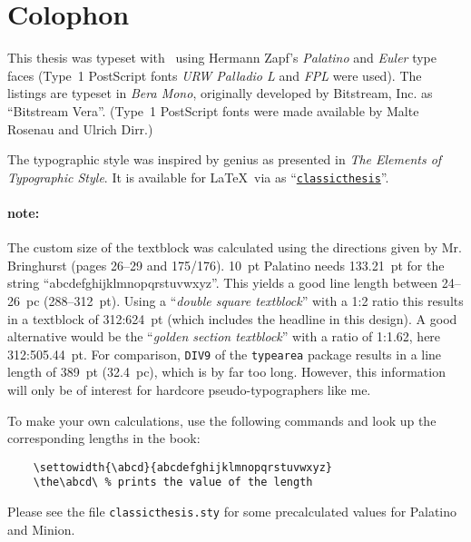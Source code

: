 \pagestyle{empty}

\hfill

\vfill


\section*{Colophon}
This thesis was typeset with \LaTeXe\ using Hermann Zapf's
\emph{Palatino}
and \emph{Euler} type faces (Type~1 PostScript fonts \emph{URW
Palladio L}
and \emph{FPL} were used). The listings are typeset in \emph{Bera
Mono}, originally developed by Bitstream, Inc. as ``Bitstream Vera''.
(Type~1 PostScript fonts were made available by Malte Rosenau and
Ulrich Dirr.)

The typographic style was inspired by genius as
presented in \emph{The Elements of Typographic Style}. It is available for \LaTeX\ via  as 
``\href{http://www.ctan.org/tex-archive/macros/latex/contrib/classicthesis/}%
{\texttt{classicthesis}}''.

\paragraph{note:} The custom size of the textblock was calculated
using the directions given by Mr. Bringhurst (pages 26--29 and
175/176). 10~pt Palatino needs  133.21~pt for the string
``abcdefghijklmnopqrstuvwxyz''. This yields a good line length between
24--26~pc (288--312~pt). Using a ``\emph{double square textblock}''
with a 1:2 ratio this results in a textblock of 312:624~pt (which
includes the headline in this design). A good alternative would be the
``\emph{golden section textblock}'' with a ratio of 1:1.62, here
312:505.44~pt. For comparison, \texttt{DIV9} of the \texttt{typearea}
package results in a line length of 389~pt (32.4~pc), which is by far
too long. However, this information will only be of interest for
hardcore pseudo-typographers like me.%

To make your own calculations, use the following commands and look up
the corresponding lengths in the book:
\begin{verbatim}
    \settowidth{\abcd}{abcdefghijklmnopqrstuvwxyz}
    \the\abcd\ % prints the value of the length
\end{verbatim}
Please see the file \texttt{classicthesis.sty} for some precalculated 
values for Palatino and Minion.

\bigskip



